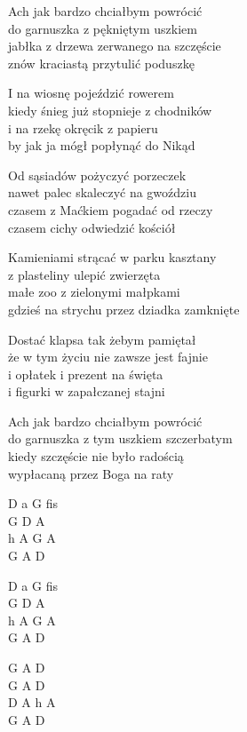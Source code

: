 \begin{text}
    Ach jak bardzo chciałbym powrócić\\
    do garnuszka z pękniętym uszkiem\\
    jabłka z drzewa zerwanego na szczęście\\
    znów kraciastą przytulić poduszkę

    I na wiosnę pojeździć rowerem\\
    kiedy śnieg już stopnieje z chodników\\
    i na rzekę okręcik z papieru\\
    by jak ja mógł popłynąć do Nikąd

    Od sąsiadów pożyczyć porzeczek\\
    nawet palec skaleczyć na gwoździu\\
    czasem z Maćkiem pogadać od rzeczy\\
    czasem cichy odwiedzić kościół

    Kamieniami strącać w parku kasztany\\
    z plasteliny ulepić zwierzęta\\
    małe zoo z zielonymi małpkami\\
    gdzieś na strychu przez dziadka zamknięte

    Dostać klapsa tak żebym pamiętał\\
    że w tym życiu nie zawsze jest fajnie\\
    i opłatek i prezent na święta\\
    i figurki w zapałczanej stajni

    Ach jak bardzo chciałbym powrócić\\
    do garnuszka z tym uszkiem szczerbatym\\
    kiedy szczęście nie było radością\\
    wypłacaną przez Boga na raty
\end{text}
\begin{chord}
    D a G fis\\
    G D A\\
    h A G A\\
    G A D

    D a G fis\\
    G D A\\
    h A G A\\
    G A D

    G A D\\
    G A D\\
    D A h A\\
    G A D
\end{chord}